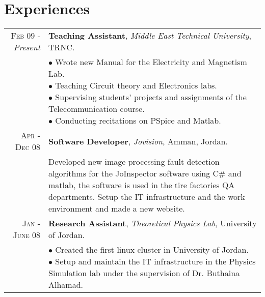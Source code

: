 \documentclass[a4paper, oneside, final]{scrartcl}
\newcommand{\twidthb}{12.65cm}
\begin{document}
\section{Experiences}

\begin{tabular}{rm{\twidthb}}
\textsc{Feb 09} - \emph{Present}  & \textbf{Teaching Assistant}, \emph{Middle East Technical University}, TRNC. \\
                    & \footnotesize{\parbox{\twidthb}{
                        $\bullet$ Wrote new Manual for the Electricity and Magnetism Lab.\\
                        $\bullet$ Teaching Circuit theory and Electronics labs.\\
                        $\bullet$ Supervising students' projects and assignments of the Telecommunication course.\\
                        $\bullet$ Conducting recitations on PSpice and Matlab.}}   

   \\ \textsc{Apr - Dec 08}  & \textbf{Software Developer}, \emph{Jovision}, Amman, Jordan. \\
                         & \footnotesize{Developed new image processing fault detection algorithms for the JoInspector software using C\# and matlab, the software is used in the tire factories QA departments. Setup the IT infrastructure and the work environment and made a new website.}

\\ \textsc{Jan - June 08}  & \textbf{Research Assistant}, \emph{Theoretical Physics Lab}, University of Jordan. \\
                               & \footnotesize{\parbox{\twidthb}{
                                $\bullet$ Created the first linux cluster in University of Jordan.\\
                                $\bullet$ Setup and maintain the IT infrastructure in the Physics Simulation lab under the supervision of Dr. Buthaina Alhamad.}}

\end{tabular}
\end{document}
